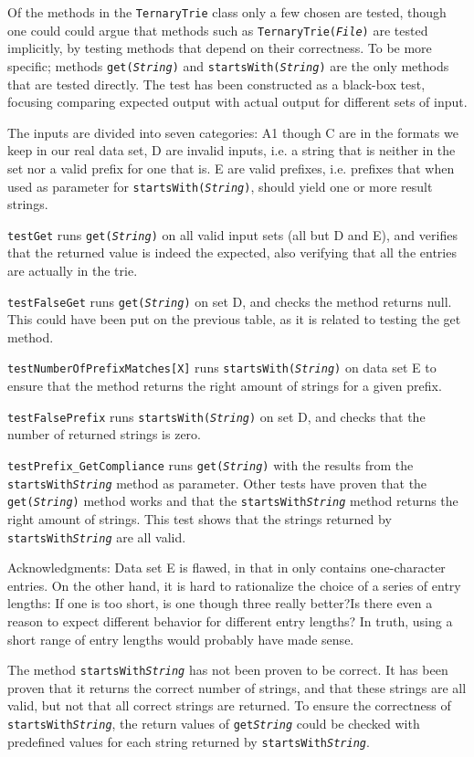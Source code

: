 Of the methods in the \texttt{TernaryTrie} class only a few chosen are tested, though one could could argue that methods such as \texttt{TernaryTrie(\textit{File})} are tested implicitly, by testing methods that depend on their correctness.
To be more specific; methods \texttt{get(\textit{String})} and \texttt{startsWith(\textit{String})} are the only methods that are tested directly.  The test has been constructed as a black-box test, focusing comparing expected output with actual output for different sets of input.

The inputs are divided into seven categories:
A1 though C are in the formats we keep in our real data set, D are invalid inputs, i.e. a string that is neither in the set nor a valid prefix for one that is.
E are valid prefixes, i.e. prefixes that when used as parameter for \texttt{startsWith(\textit{String})}, should yield one or more result strings.

\texttt{testGet} runs \texttt{get(\textit{String})} on all valid input sets (all but D and E), and verifies that the returned value is indeed the expected, also verifying that all the entries are actually in the trie.

\texttt{testFalseGet} runs \texttt{get(\textit{String})} on set D, and checks the method returns null. This could have been put on the previous table, as it is related to testing the get method.

\texttt{testNumberOfPrefixMatches[X]} runs \texttt{startsWith(\textit{String})} on data set E to ensure that the method returns the right amount of strings for a given prefix.

\texttt{testFalsePrefix} runs \texttt{startsWith(\textit{String})} on set D, and checks that the number of returned strings is zero.

\texttt{testPrefix_GetCompliance} runs \texttt{get(\textit{String})} with the results from the \texttt{startsWith\textit{String}} method as parameter. Other tests have proven that the \texttt{get(\textit{String})} method works and that the \texttt{startsWith\textit{String}} method returns the right amount of strings. This test shows that the strings returned by \texttt{startsWith\textit{String}} are all valid.

Acknowledgments:
Data set E is flawed, in that in only contains one-character entries. On the other hand, it is hard to rationalize the choice  of a series of entry lengths: If one is too short, is one though three really better?Is there even a reason to expect different behavior for different entry lengths? In truth, using a short range of entry lengths would probably have made sense.

The method \texttt{startsWith\textit{String}} has not been proven to be correct. It has been proven that it returns the correct number of strings, and that these strings are all valid, but not that all correct strings are returned. To ensure the correctness of \texttt{startsWith\textit{String}}, the return values of \texttt{get\textit{String}} could be checked with predefined values for each string returned by \texttt{startsWith\textit{String}}.